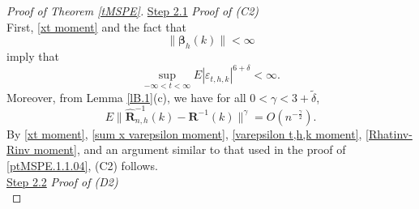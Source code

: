 \documentclass[ejsv2]{imsart}
\theoremstyle{plain}
\theoremstyle{definition}
\theoremstyle{remark}
\begin{document}
\begin{proof}[Proof of Theorem \ref{tMSPE}]
{\noindent
\underline{Step 2.1} \textit{Proof of {\rm(C2)}}\\

First, \eqref{xt moment} and the fact that
\begin{equation}\label{beta_h(k) finite}
\lVert\bm{\beta}_h(k)\rVert<\infty
\end{equation}
imply that
\begin{equation}\label{varepsilon t,h,k moment}
\sup\limits_{-\infty<t<\infty}E|\varepsilon_{t,h,k}|^{6+\delta}<\infty.
\end{equation}
Moreover, from Lemma \ref{lB.1}(c), we have for all $0<\gamma< 3+\tilde{\delta}$,
\begin{equation}\label{Rhatinv-Rinv moment}
E\lVert\hat{\mathbf{R}}^{-1}_{n,h}(k)-\mathbf{R}^{-1}(k)\rVert^{\gamma}=O(n^{-\frac{\gamma}{2}}).
\end{equation}
By \eqref{xt moment}, \eqref{sum x varepsilon moment}, \eqref{varepsilon t,h,k moment}, \eqref{Rhatinv-Rinv moment},
and an argument similar to that used in the proof of \eqref{ptMSPE.1.1.04}, (C2) follows.\\


\noindent
\underline{Step 2.2} \textit{Proof of {\rm(D2)}}\\



}
\end{proof}
\end{document}
